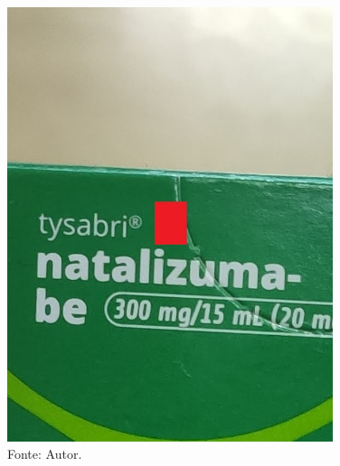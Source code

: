 \begin{frame}
\begin{columns}
\begin{column}{0.5\textwidth}
\begin{figure}
				\includegraphics[width=0.85\textwidth]{../pictures/tysabri cortado.jpg}
				\caption*{Fonte: Autor.}
			\end{figure}
		\end{column}
	\end{columns}
\end{frame}



